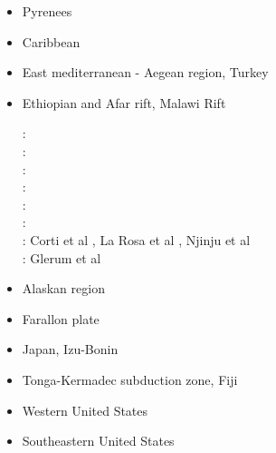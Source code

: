 \begin{itemize}
\item {Pyrenees} 
{\scriptsize
\cite{chou92}
\cite{qubh93}
\cite{giju98}
\cite{bemh00}
\cite{mcmg04}\cite{siss04}
\cite{jaml10}
\cite{vime12}
\cite{fihv13b}
\cite{jahm14}
\cite{dual19}\cite{jolm19}
}

\item{Caribbean} 
{\scriptsize
\cite{vago10}
\cite{vags13}
\cite{bovt14}\cite{vagw14}\cite{necb14}
\cite{homi15}\cite{necb15}
\cite{phvb20}\cite{mugu20}
}
\item{East mediterranean - Aegean region, Turkey} 
{\scriptsize
\cite{gabm99}
\cite{cazf10}
\cite{enlm11}
\cite{jofh13}
\cite{ozgw17}
\cite{rohb20}\cite{femb20}
}
\item{Ethiopian and Afar rift, Malawi Rift} 

\begin{scriptsize}
\twothousandseven:
\cite{mitk07}\\
\twothousandeight:
\cite{cort08}\\
\twothousandnine:
\cite{kekj09}\\
\twothousandten:
\cite{beve10}\\
\twothousandfourteen:
\cite{phcs14}\cite{sacs14}\\
\twothousandseventeen:
\cite{brcr17} \cite{brcg17}\\
\twothousandnineteen:
Corti et al \cite{cocf19}, La Rosa et al \cite{lapk19}, Njinju et al \cite{njas19}\\
\twothousandtwenty:
Glerum et al \cite{glbs20}
\end{scriptsize}

\item{Alaskan region} 
{\scriptsize
\cite{jabi10a}
\cite{jabi12}
\cite{jabr13}
\cite{haja17}
\cite{mimo18}
}
\item{Farallon plate} 
{\scriptsize
\cite{lisg08}
\cite{list11}
\cite{list12}
\cite{licu16}
}
\item{Japan, Izu-Bonin} 
{\scriptsize
\cite{hond85}
\cite{lohd07}
\cite{vakn12}
\cite{musi13}
\cite{kigk14}\cite{leli14}\cite{mova14}\cite{hond14}
\cite{kilk15}
\cite{yagz17}
\cite{yamg19}
\cite{mapg20}
}
\item{Tonga-Kermadec subduction zone, Fiji} 
{\scriptsize
\cite{bigs03}\cite{bigu03}
\cite{zhpy06}
}
\item{Western United States}
{\scriptsize
\cite{besb06}
}
\item{Southeastern United States}
{\scriptsize
\cite{heps18}
}


\end{itemize}
